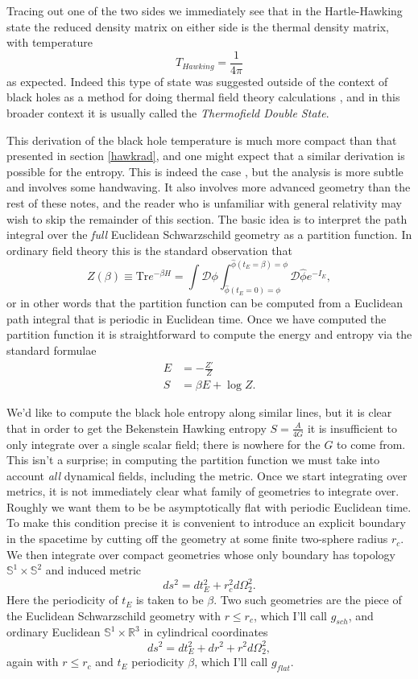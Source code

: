 \documentclass[12pt]{article}
\newcommand{\be}{\begin{equation}}
\newcommand{\ee}{\end{equation}}
\begin{document}
Tracing out one of the two sides we immediately see that in the Hartle-Hawking state the reduced density matrix on either side is the thermal density  matrix, with temperature
\be
T_{Hawking}=\frac{1}{4\pi}
\ee
as expected.  Indeed this type of state was suggested outside of the context of black holes as a method for doing thermal field theory calculations \cite{Takahashi:1996zn}, and in this broader context it is usually called the \textit{Thermofield Double State}.

This derivation of the black hole temperature is much more compact than that presented in section \ref{hawkrad}, and one might expect that a similar derivation is possible for the entropy.  This is indeed the case \cite{Gibbons:1976ue}, but the analysis is more subtle and involves some handwaving.  It also involves more advanced geometry than the rest of these notes, and the reader who is unfamiliar with general relativity may wish to skip the remainder of this section.  The basic idea is to interpret the path integral over the \textit{full} Euclidean Schwarzschild geometry as a partition function.  In ordinary field theory this is the standard observation that
\be\label{partf}
Z(\beta)\equiv \mathrm{Tr} e^{-\beta H}=\int \mathcal{D}\phi \int_{\hat{\phi}(t_E=0)=\phi}^{\hat{\phi}(t_E=\beta)=\phi} \mathcal{D}\hat{\phi}e^{-I_E},
\ee 
or in other words that the partition function can be computed from a Euclidean path integral that is periodic in Euclidean time.  Once we have computed the partition function it is straightforward to compute the energy and entropy via the standard formulae
\begin{align}\nonumber
E&=-\frac{Z'}{Z}\\
S&=\beta E+\log Z.\label{statmech}
\end{align}

We'd like to compute the black hole entropy along similar lines, but it is clear that in order to get the Bekenstein Hawking entropy $S=\frac{A}{4G}$ it is insufficient to only integrate over a single scalar field; there is nowhere for the $G$ to come from.  This isn't a surprise; in computing the partition function we must take into account \textit{all} dynamical fields, including the metric.  Once we start integrating over metrics, it is not immediately clear what family of geometries to integrate over.  Roughly we want them to be be asymptotically flat with periodic Euclidean time.  To make this condition precise it is convenient to introduce an explicit boundary in the spacetime by cutting off the geometry at some finite two-sphere radius $r_c$.  We then integrate over compact geometries whose only boundary has topology $\mathbb{S}^1\times \mathbb{S}^2$ and induced metric
\be\label{minkbmet}
ds^2=dt_E^2+r_c^2 d\Omega_2^2.
\ee
Here the periodicity of $t_E$ is taken to be $\beta$.  Two such geometries are the piece of the Euclidean Schwarzschild geometry with $r\leq r_c$, which I'll call $g_{sch}$, and ordinary Euclidean $\mathbb{S}^1\times \mathbb{R}^3$ in cylindrical coordinates
\be
ds^2=dt_E^2+dr^2+r^2d \Omega_2^2,
\ee
again with $r\leq r_c$ and $t_E$ periodicity $\beta$, which I'll call $g_{flat}$.  
\end{document}
